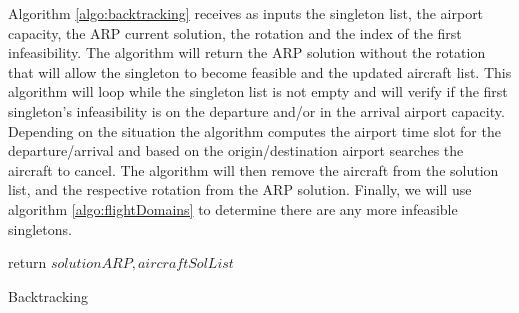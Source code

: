 
Algorithm \ref{algo:backtracking} receives as inputs the singleton list, the airport capacity, the ARP current solution, the rotation and the index of the first infeasibility. The algorithm will return the ARP solution without the rotation that will allow the singleton to become feasible and the updated aircraft list. This algorithm will loop while the singleton list is not empty and will verify if the first singleton's infeasibility is on the departure and/or in the arrival airport capacity. Depending on the situation the algorithm computes the airport time slot for the departure/arrival and based on the origin/destination airport searches the  aircraft to cancel. The algorithm will then remove the aircraft from the solution list, and the respective rotation from the ARP solution. Finally, we will use algorithm \ref{algo:flightDomains} to determine there are any more infeasible singletons.
\begin{algorithm}[H]
	\DontPrintSemicolon
	\While{$ singletonList \ne \{\}$}{
		
		\If{$singletonList(0) = 'dep'$}{
			$startInt \gets 60 * int(singleton^d(0)/60)$\\
			$endInt \gets startInt + 60$\\
			$origin \gets singleton^o(0)$\\
			$flight2Cancel \gets solutionARP[(origin, startInt, endInt)]$\\
			$airc2Cancel \gets updateMulti(flight2Cancel, \mathcal{A}, solutionARP])$\\
			$aircraftSolList \gets aircraftSolList - airc2Cancel$\\
			$solutionARP.pop(airc2Cancel)$\\
			$flightRanges, singletonList, totalCombos \gets domainFlights(\sigma_p(i) \forall i \in [index, |\sigma_p|], \mathcal{A}, index)$\\
		}
		\If{$singleton(0) = 'arr'$}{
			$startInt \gets 60 * int(singleton^a(0)/60)$\\
			$endInt \gets startInt + 60$\\
			$destination \gets singleton^f(0)$\\
			$flight2Cancel \gets solutionARP[(destination, startInt, endInt)]$\\
			$airc2Cancel \gets updateMulti(flight2Cancel, \mathcal{A}, solutionARP)$\\
			$aircraftSolList \gets aircraftSolList - airc2Cancel$\\
			$solutionARP.pop(airc2Cancel)$\\
			$flightRanges, singletonList, totalCombos \gets domainFlights(\sigma_p(i) \forall i \in [index, |\sigma_p|], \mathcal{A}, index)$\\
		}

	}
	return $solutionARP, aircraftSolList$
	\caption{Backtracking}
	\label{algo:backtracking}
\end{algorithm}


